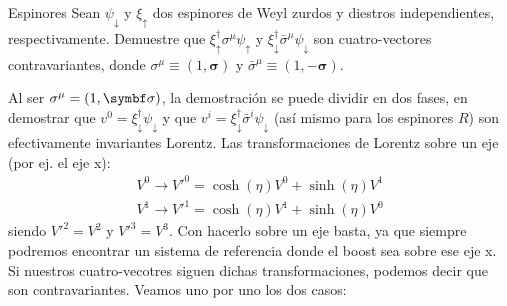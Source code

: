

\begin{Ejercicio}{Espinores}
	Sean $\psi_\downarrow$ y $\xi_\uparrow$ dos espinores de Weyl zurdos y diestros independientes, respectivamente.  Demuestre que $\xi_\uparrow^\dagger \sigma^\mu \psi_\uparrow$ y $\xi_\downarrow^\dagger \bar{\sigma}^\mu \psi_\downarrow$ son cuatro-vectores contravariantes,  donde $\sigma^\mu \equiv (1,\symbf{\sigma})$ y $\bar{\sigma}^\mu \equiv (1,-\symbf{\sigma})$.
\end{Ejercicio}

Al ser $\sigma^\mu = (1,\sigman)$, la demostración se puede dividir en dos fases, en demostrar que $v^0=\xi_\downarrow^\dagger \psi_\downarrow$ y que $v^i =\xi_\downarrow^\dagger  \bar{\sigma}^i \psi_\downarrow$ (así mismo para los espinores $R$) son efectivamente invariantes Lorentz. Las transformaciones de Lorentz sobre un eje (por ej. el eje x):
\begin{eqnarray}
	V^0 \to V'^0 = \cosh (\eta) V^0 + \sinh (\eta)  V^{1}\\
	V^1 \to V'^1 = \cosh (\eta) V^1 + \sinh (\eta)  V^{0}
\end{eqnarray}
siendo $V'^2=V^2$ y $V'^3=V^3$. Con hacerlo sobre un eje basta, ya que siempre podremos encontrar un sistema de referencia donde el boost sea sobre ese eje x. Si nuestros cuatro-vecotres siguen dichas transformaciones, podemos decir que son contravariantes. Veamos uno por uno los dos casos:

